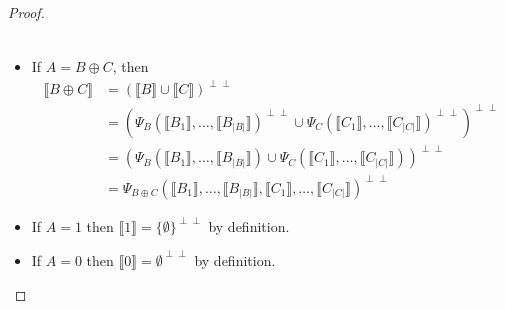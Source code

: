 \documentclass{article}
\newcommand\size[1]{{\lvert #1 \rvert}}
\newcommand\sem[1]{{\llbracket #1 \rrbracket}}
\newcommand\biperp{{\perp\perp}}
\begin{document}
\begin{proof}
\begin{itemize}
\begin{align*}
        \end{align*}
        \item If $A = B \oplus C$, then \begin{align*}
            \sem{B \oplus C} &= (\sem{B} \cup \sem{C})^\biperp \\
            &= (\Psi_B(\sem{B_1}, \dots, \sem{B_\size{B}})^\biperp \cup \Psi_C(\sem{C_1}, \dots, \sem{C_\size{C}})^\biperp)^\biperp \\
            &= (\Psi_B(\sem{B_1}, \dots, \sem{B_\size{B}}) \cup \Psi_C(\sem{C_1}, \dots, \sem{C_\size{C}}))^\biperp \\
            &= \Psi_{B \oplus C}(\sem{B_1}, \dots, \sem{B_\size{B}}, \sem{C_1}, \dots, \sem{C_\size{C}})^\biperp
        \end{align*}
        \item If $A = 1$ then $\sem{1} = \{\emptyset\}^\biperp$ by definition.
        \item If $A = 0$ then $\sem{0} = \emptyset^\biperp$ by definition.
    \end{itemize}
\end{proof}
\end{document}
